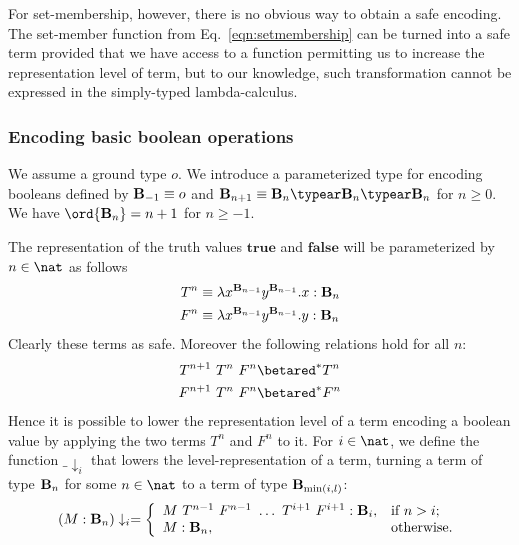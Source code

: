 For set-membership, however, there is no obvious way to obtain a safe encoding. The set-member function from Eq.\ \ref{eqn:setmembership} can be turned into a safe term provided that we have access to a function permitting us to increase the representation level of term, but to our knowledge, such transformation cannot be expressed in the simply-typed lambda-calculus.



\subsubsection{Encoding basic boolean operations}

We assume a ground type $o$.
We introduce a parameterized type for encoding booleans defined by $\mathbf{B}_{-1} \equiv o$ and $\booltype_{n+1} \equiv \booltype_n\typear\booltype_n\typear\booltype_n$ for $n\geq0$.
We have $\ord{\booltype_n} = n+1$ for $n\geq-1$.


The representation of the truth values $\mathbf{true}$ and $\mathbf{false}$ will be parameterized by $n \in \nat$ as follows
\begin{align*}
  T^n &\equiv \lambda x^{\mathbf{B}_{n-1}} y^{\mathbf{B}_{n-1}} .x : \mathbf{B}_{n}\\
  F^n &\equiv \lambda x^{\mathbf{B}_{n-1}} y^{\mathbf{B}_{n-1}} .y : \mathbf{B}_{n}
\end{align*}
Clearly these terms as safe. Moreover the following relations hold for all $n$:
\begin{align*}
  T^{n+1}~T^n~F^n &\betared^*  T^n \\
  F^{n+1}~T^n~F^n &\betared^*  F^n
\end{align*}
Hence it is possible to lower the representation level of a term encoding a boolean value by applying the two terms $T^n$ and $F^n$ to it.
For $i\in\nat$, we define the function $\_ \downarrow_i$ that lowers the level-representation of a term, turning a term of type $\mathbf{B}_n$ for some $n\in\nat$ to a term of type $\mathbf{B}_{\min(i,l)}$:
$$ (M :\mathbf{B}_n)\downarrow_i = \left\{
  \begin{array}{ll}
    M~T^{n-1}~F^{n-1}~\ldots~T^{i+1}~F^{i+1}:\mathbf{B}_i, & \hbox{if $n>i$;} \\
M:\mathbf{B}_n, & \hbox{otherwise.}
  \end{array}
  \right.
$$


